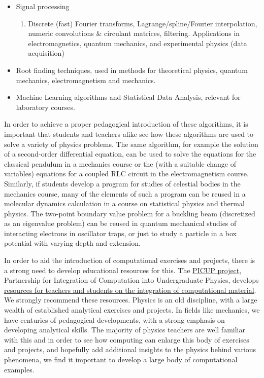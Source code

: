 \documentclass[graybox,envcountchap,sectrefs]{svmult}
\begin{document}
\begin{itemize}
\begin{enumerate}
\end{enumerate}

\noindent
\item Signal processing
\begin{enumerate}

  \item Discrete (fast) Fourier transforms, Lagrange/spline/Fourier interpolation, numeric convolutions {\&} circulant matrices, filtering. Applications in electromagnetics, quantum mechanics, and experimental physics (data acquisition)

\end{enumerate}

\noindent
\item Root finding techniques, used in methods for theoretical physics, quantum mechanics, electromagnetism and mechanics.

\item Machine Learning algorithms and Statistical Data Analysis, relevant for laboratory courses.
\end{itemize}

\noindent
In order to achieve a proper pedagogical introduction of these
algorithms, it is important that students and teachers alike see how
these algorithms are used to solve a variety of physics problems. The
same algorithm, for example the solution of a second-order
differential equation, can be used to solve the equations for the
classical pendulum in a mechanics course or the (with a suitable
change of variables) equations for a coupled RLC circuit in the
electromagnetism course. Similarly, if students develop a program for
studies of celestial bodies in the mechanics course, many of the
elements of such a program can be reused in a molecular dynamics
calculation in a course on statistical physics and thermal
physics. The two-point boundary value problem for a buckling beam
(discretized as an eigenvalue problem) can be reused in quantum
mechanical studies of interacting electrons in oscillator traps, or
just to study a particle in a box potential with varying depth and
extension.

In order to aid the introduction of computational exercises and
projects, there is a strong need to develop educational resources for this. The
\href{{http://www.compadre.org/picup/}}{PICUP project}, Partnership for
Integration of Computation into Undergraduate Physics, develops
\href{{http://www.compadre.org/PICUP/resources/}}{resources for teachers and students on the integration of
computational material}.
We strongly recommend these resources.  Physics is an old discipline,
with a large wealth of established analytical exercises and
projects. In fields like mechanics, we have centuries of pedagogical
developments, with a strong emphasis on developing analytical
skills. The majority of physics teachers are well familiar with this
and in order to see how computing can enlarge this body of exercises
and projects, and hopefully add additional insights to the physics
behind various phenomena, we find it important to develop a large body
of computational examples.
\end{document}
